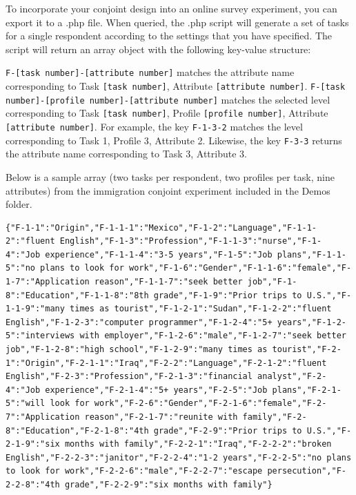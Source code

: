 \documentclass[12pt]{article}
\begin{document}
To incorporate your conjoint design into an online survey experiment, you can export it to a .php file. When queried, the .php script will generate a set of tasks for a single respondent according to the settings that you have specified. The script will return an array object with the following key-value structure:

\texttt{F-[task number]-[attribute number]} matches the attribute name corresponding to Task \texttt{[task number]}, Attribute \texttt{[attribute number]}. \texttt{F-[task number]-[profile number]-[attribute number]} matches the selected level corresponding to Task \texttt{[task number]}, Profile \texttt{[profile number]}, Attribute \texttt{[attribute number]}. For example, the key \texttt{F-1-3-2} matches the level corresponding to Task 1, Profile 3, Attribute 2. Likewise, the key \texttt{F-3-3} returns the attribute name corresponding to Task 3, Attribute 3.

Below is a sample array (two tasks per respondent, two profiles per task, nine attributes) from the immigration conjoint experiment included in the Demos folder.

\begin{lstlisting}
{"F-1-1":"Origin","F-1-1-1":"Mexico","F-1-2":"Language","F-1-1-2":"fluent English","F-1-3":"Profession","F-1-1-3":"nurse","F-1-4":"Job experience","F-1-1-4":"3-5 years","F-1-5":"Job plans","F-1-1-5":"no plans to look for work","F-1-6":"Gender","F-1-1-6":"female","F-1-7":"Application reason","F-1-1-7":"seek better job","F-1-8":"Education","F-1-1-8":"8th grade","F-1-9":"Prior trips to U.S.","F-1-1-9":"many times as tourist","F-1-2-1":"Sudan","F-1-2-2":"fluent English","F-1-2-3":"computer programmer","F-1-2-4":"5+ years","F-1-2-5":"interviews with employer","F-1-2-6":"male","F-1-2-7":"seek better job","F-1-2-8":"high school","F-1-2-9":"many times as tourist","F-2-1":"Origin","F-2-1-1":"Iraq","F-2-2":"Language","F-2-1-2":"fluent English","F-2-3":"Profession","F-2-1-3":"financial analyst","F-2-4":"Job experience","F-2-1-4":"5+ years","F-2-5":"Job plans","F-2-1-5":"will look for work","F-2-6":"Gender","F-2-1-6":"female","F-2-7":"Application reason","F-2-1-7":"reunite with family","F-2-8":"Education","F-2-1-8":"4th grade","F-2-9":"Prior trips to U.S.","F-2-1-9":"six months with family","F-2-2-1":"Iraq","F-2-2-2":"broken English","F-2-2-3":"janitor","F-2-2-4":"1-2 years","F-2-2-5":"no plans to look for work","F-2-2-6":"male","F-2-2-7":"escape persecution","F-2-2-8":"4th grade","F-2-2-9":"six months with family"}
\end{lstlisting}
\end{document}
